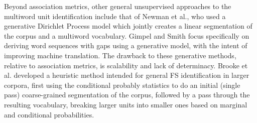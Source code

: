 \documentclass[11pt]{article}
\makeatletter
\def \eg {e.g.,\@ }
\def \al {al.\@ }
\makeatother
\begin{document}
Beyond association metrics, other general unsupervised approaches to the multiword unit identification include that of Newman et \al {}, who used a generative Dirichlet Process model which jointly creates a linear segmentation of the corpus and a multiword vocabulary. Gimpel and Smith  focus specifically on deriving word sequences with gaps using a generative model, with the intent of improving machine translation. The drawback to these generative methods, relative to association metrics, is scalability and lack of determinacy. Brooke et \al {} developed a heuristic method intended for general FS identification in  larger corpora, first using the conditional probably statistics to do an initial (single pass) coarse-grained segmentation of the corpus, followed by a pass through the resulting vocabulary, breaking larger units into smaller ones based on marginal and conditional probabilities. 




\end{document}
